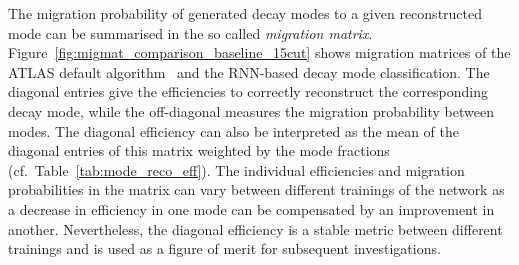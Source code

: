 The migration probability of generated decay modes to a given reconstructed mode
can be summarised in the so called \emph{migration matrix}.
Figure~\ref{fig:migmat_comparison_baseline_15cut} shows migration matrices of
the ATLAS default algorithm~\cite{atlas:taurec:decaymodes} and the RNN-based
decay mode classification. The diagonal entries give the efficiencies to
correctly reconstruct the corresponding decay mode, while the off-diagonal
measures the migration probability between modes. The diagonal efficiency can
also be interpreted as the mean of the diagonal entries of this matrix weighted
by the mode fractions (cf.\ Table~\ref{tab:mode_reco_eff}). The individual
efficiencies and migration probabilities in the matrix can vary between
different trainings of the network as a decrease in efficiency in one mode can
be compensated by an improvement in another. Nevertheless, the diagonal
efficiency is a stable metric between different trainings and is used as a
figure of merit for subsequent investigations.

